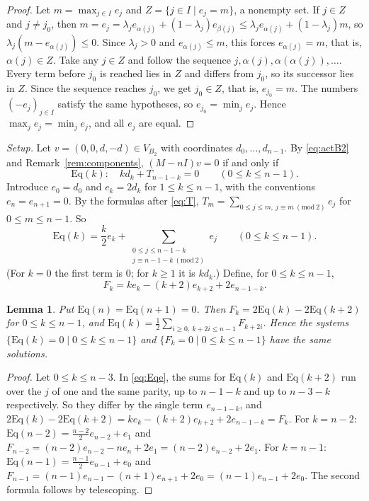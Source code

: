 \documentclass[11pt]{amsart}
\theoremstyle{plain}
\newtheorem{lemma}{Lemma}
\theoremstyle{definition}
\theoremstyle{remark}
\numberwithin{equation}{section}
\newcommand{\Eq}{\mathrm{Eq}}
\newcommand{\VBb}{V_{B_2}}
\begin{document}
\begin{proof}
Let \(m=\max_{j\in I}e_j\) and \(Z=\{j\in I\mid e_j=m\}\), a nonempty set. If \(j\in Z\)
and \(j\ne j_0\), then
\(m=e_j=\lambda_je_{\alpha(j)}+(1-\lambda_j)e_{\beta(j)}\le\lambda_je_{\alpha(j)}
+(1-\lambda_j)m\), so \(\lambda_j(m-e_{\alpha(j)})\le0\). Since \(\lambda_j>0\) and
\(e_{\alpha(j)}\le m\), this forces \(e_{\alpha(j)}=m\), that is, \(\alpha(j)\in Z\).
Take any \(j\in Z\) and follow the sequence \(j,\alpha(j),\alpha(\alpha(j)),\dots\).
Every term before \(j_0\) is reached lies in \(Z\) and differs from \(j_0\), so its
successor lies in \(Z\). Since the sequence reaches \(j_0\), we get \(j_0\in Z\), that
is, \(e_{j_0}=m\). The numbers \((-e_j)_{j\in I}\) satisfy the same hypotheses, so
\(e_{j_0}=\min_je_j\). Hence \(\max_je_j=\min_je_j\), and all \(e_j\) are equal.
\end{proof}

\emph{Setup.} Let \(v=(0,0,d,-d)\in\VBb\) with coordinates \(d_0,\dots,d_{n-1}\). By
\eqref{eq:actB2} and Remark~\ref{rem:components}, \((M-nI)v=0\) if and only if
\begin{equation}\label{eq:Eq}
\Eq(k):\quad kd_k+T_{n-1-k}=0\qquad(0\le k\le n-1).
\end{equation}
Introduce \(e_0=d_0\) and \(e_k=2d_k\) for \(1\le k\le n-1\), with the conventions
\(e_n=e_{n+1}=0\). By the formulas after \eqref{eq:T},
\(T_m=\sum_{0\le j\le m,\ j\equiv m\ (\mathrm{mod}\ 2)}e_j\) for \(0\le m\le n-1\). So
\begin{equation}\label{eq:Eqe}
\Eq(k)=\frac k2e_k+\sum_{\substack{0\le j\le n-1-k\\ j\equiv n-1-k\ (\mathrm{mod}\ 2)}}e_j
\qquad(0\le k\le n-1).
\end{equation}
(For \(k=0\) the first term is \(0\); for \(k\ge1\) it is \(kd_k\).) Define, for
\(0\le k\le n-1\),
\begin{equation}\label{eq:F}
F_k=ke_k-(k+2)e_{k+2}+2e_{n-1-k}.
\end{equation}

\begin{lemma}\label{lem:F}
Put \(\Eq(n)=\Eq(n+1)=0\). Then \(F_k=2\Eq(k)-2\Eq(k+2)\) for \(0\le k\le n-1\), and
\(\Eq(k)=\frac12\sum_{i\ge0,\ k+2i\le n-1}F_{k+2i}\). Hence the systems
\(\{\Eq(k)=0\mid 0\le k\le n-1\}\) and \(\{F_k=0\mid 0\le k\le n-1\}\) have the same
solutions.
\end{lemma}

\begin{proof}
Let \(0\le k\le n-3\). In \eqref{eq:Eqe}, the sums for \(\Eq(k)\) and \(\Eq(k+2)\) run
over the \(j\) of one and the same parity, up to \(n-1-k\) and up to \(n-3-k\)
respectively. So they differ by the single term \(e_{n-1-k}\), and
\(2\Eq(k)-2\Eq(k+2)=ke_k-(k+2)e_{k+2}+2e_{n-1-k}=F_k\). For \(k=n-2\):
\(\Eq(n-2)=\frac{n-2}2e_{n-2}+e_1\) and \(F_{n-2}=(n-2)e_{n-2}-ne_n+2e_1
=(n-2)e_{n-2}+2e_1\). For \(k=n-1\): \(\Eq(n-1)=\frac{n-1}2e_{n-1}+e_0\) and
\(F_{n-1}=(n-1)e_{n-1}-(n+1)e_{n+1}+2e_0=(n-1)e_{n-1}+2e_0\). The second formula follows
by telescoping.
\end{proof}
\end{document}

